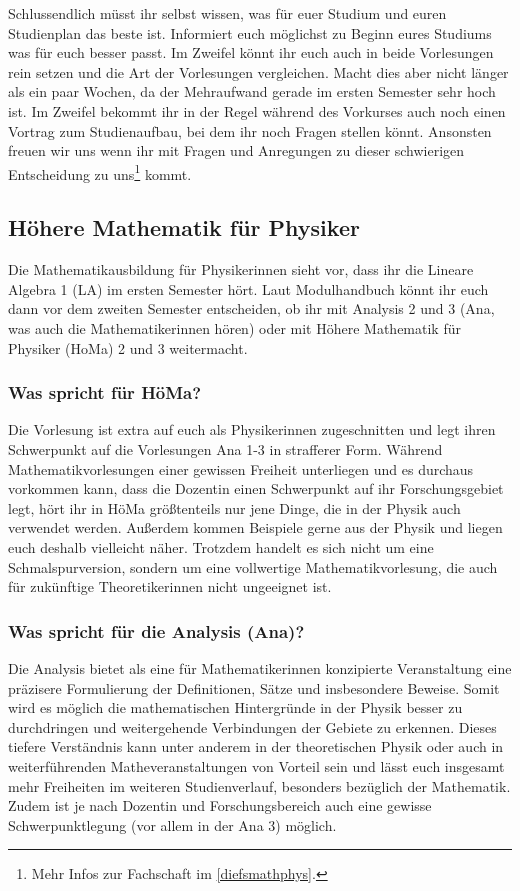Schlussendlich müsst ihr selbst wissen, was für euer Studium und euren Studienplan das beste ist. Informiert euch möglichst zu Beginn eures Studiums was für euch besser passt. Im Zweifel könnt ihr euch auch in beide Vorlesungen rein setzen und die Art der Vorlesungen vergleichen. Macht dies aber nicht länger als ein paar Wochen, da der Mehraufwand gerade im ersten Semester sehr hoch ist. Im Zweifel bekommt ihr in der Regel während des Vorkurses auch noch einen Vortrag zum Studienaufbau, bei dem ihr noch Fragen stellen könnt. Ansonsten freuen wir uns wenn ihr mit Fragen und Anregungen zu dieser schwierigen Entscheidung zu uns\footnote{Mehr Infos zur Fachschaft im \autoref{diefsmathphys}.} kommt.

\subsection{Höhere Mathematik für Physiker}
\label{mathephysik}
Die Mathematikausbildung für Physikerinnen sieht vor, dass ihr die Lineare Algebra 1 (\gls{LA}) im ersten Semester hört. Laut Modulhandbuch könnt ihr euch dann vor dem zweiten Semester entscheiden, ob ihr mit Analysis 2 und 3 (\gls{Ana}, was auch die Mathematikerinnen hören) oder mit Höhere Mathematik für Physiker (\gls{HoMa}) 2 und 3 weitermacht.
\subsubsection{Was spricht für HöMa?}
Die Vorlesung ist extra auf euch als Physikerinnen zugeschnitten und legt ihren Schwerpunkt auf die Vorlesungen Ana 1-3 in strafferer Form. Während Mathematikvorlesungen einer gewissen Freiheit unterliegen und es durchaus vorkommen kann, dass die Dozentin einen Schwerpunkt auf ihr Forschungsgebiet legt, hört ihr in HöMa größtenteils nur jene Dinge, die in der Physik auch verwendet werden. Außerdem kommen Beispiele gerne aus der Physik und liegen euch deshalb vielleicht näher. Trotzdem handelt es sich nicht um eine Schmalspurversion, sondern um eine vollwertige Mathematikvorlesung, die auch für zukünftige Theoretikerinnen nicht ungeeignet ist.
\subsubsection{Was spricht für die Analysis (Ana)?}
Die Analysis bietet als eine für Mathematikerinnen konzipierte Veranstaltung eine präzisere Formulierung der Definitionen, Sätze und insbesondere Beweise. Somit wird es möglich die mathematischen Hintergründe in der Physik besser zu durchdringen und weitergehende Verbindungen der Gebiete zu erkennen. Dieses tiefere Verständnis kann unter anderem in der theoretischen Physik oder auch in weiterführenden Matheveranstaltungen von Vorteil sein und lässt euch insgesamt mehr Freiheiten im weiteren Studienverlauf, besonders bezüglich der Mathematik. Zudem ist je nach Dozentin und Forschungsbereich auch eine gewisse Schwerpunktlegung (vor allem in der Ana 3) möglich.\\

